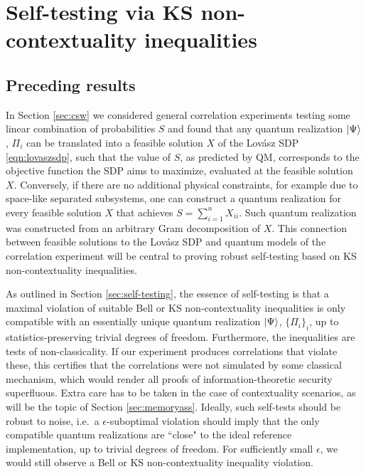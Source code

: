 \chapter{Self-testing via KS non-contextuality inequalities}
\label{sec:contselftesting}

\section{Preceding results}

In Section \ref{sec:csw} we considered general correlation experiments testing some linear combination of probabilities $S$ and found that any quantum realization $\ket{\Psi}$, $\Pi_i$ can be translated into a feasible solution $X$ of the Lovász SDP \ref{eqn:lovaszsdp}, such that the value of $S$, as predicted by QM, corresponds to the objective function the SDP aims to maximize, evaluated at the feasible solution $X$. Conversely, if there are no additional physical constraints, for example due to space-like separated subsystems, one can construct a quantum realization for every feasible solution $X$ that achieves $S=\sum_{i=1}^n X_{ii}$. Such quantum realization was constructed from an arbitrary Gram decomposition of $X$. This connection between feasible solutions to the Lovász SDP and quantum models of the correlation experiment will be central to proving robust self-testing based on KS non-contextuality inequalities.

As outlined in Section \ref{sec:self-testing}, the essence of self-testing is that a maximal violation of suitable Bell or KS non-contextuality inequalities is only compatible with an essentially unique quantum realization $\ket{\Psi}$, $\{\Pi_i\}_i$, up to statistics-preserving trivial degrees of freedom. Furthermore, the inequalities are tests of non-classicality. If our experiment produces correlations that violate these, this certifies that the correlations were not simulated by some classical mechanism, which would render all proofs of information-theoretic security superfluous. Extra care has to be taken in the case of contextuality scenarios, as will be the topic of Section \ref{sec:memoryass}. Ideally, such self-tests should be robust to noise, i.e.\ a $\epsilon$-suboptimal violation should imply that the only compatible quantum realizations are ``close" to the ideal reference implementation, up to trivial degrees of freedom. For sufficiently small $\epsilon$, we would still observe a Bell or KS non-contextuality inequality violation.

